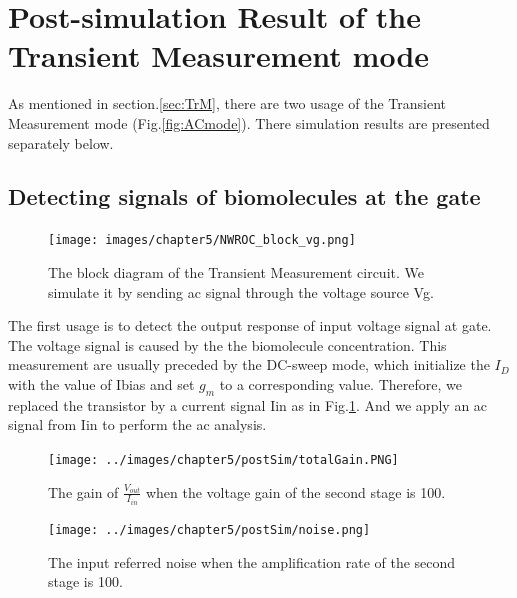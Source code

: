 {\FloatBarrier

\section{Post-simulation Result of the Transient Measurement mode}
As mentioned in section.\ref{sec:TrM}, there are two usage of the Transient Measurement mode (Fig.\ref{fig:ACmode}).
There simulation results are presented separately below.

\subsection{Detecting signals of biomolecules at the gate}

\begin{figure}[!htbp]
    \centering
        \texttt{[image: images/chapter5/NWROC\_block\_vg.png]}
    \caption{The block diagram of the Transient Measurement circuit. We simulate it by sending ac signal through the voltage source Vg.}
    \label{fig:Nblockvg}
\end{figure}

The first usage is to detect the output response of input voltage signal at gate.
The voltage signal is caused by the the biomolecule concentration.
This measurement are usually preceded by the DC-sweep mode, which initialize the $I_D$ with the value of Ibias and set $g_m$ to a corresponding value.
Therefore, we replaced the transistor by a current signal Iin as in Fig.\ref{fig:Nblockvg}.
And we apply an ac signal from Iin to perform the ac analysis.

\begin{figure}[!htb]
    \centering
        \texttt{[image: ../images/chapter5/postSim/totalGain.PNG]}
    \caption{The gain of $\frac{V_{out}}{I_{in}}$ when the voltage gain of the second stage is 100.}
    \label{fig:sim:vgGain}
\end{figure}

\begin{figure}[!htb]
    \centering
        \texttt{[image: ../images/chapter5/postSim/noise.png]}
    \caption{The input referred noise when the amplification rate of the second stage is 100.}
    \label{fig:sim:vgnoise}
\end{figure}


}
